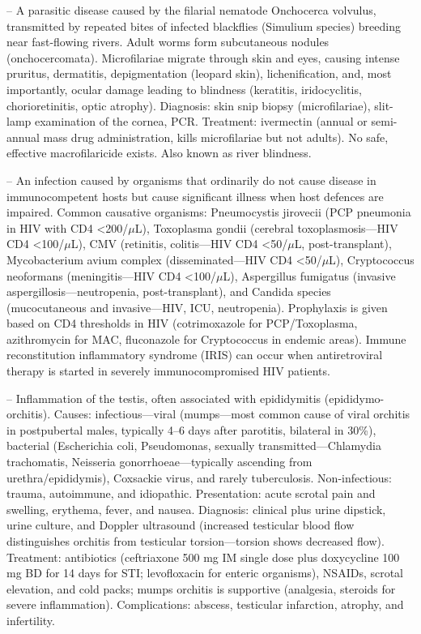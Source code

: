 -- A parasitic disease caused by the filarial nematode Onchocerca volvulus, transmitted by repeated bites of infected blackflies (Simulium species) breeding near fast-flowing rivers. Adult worms form subcutaneous nodules (onchocercomata). Microfilariae migrate through skin and eyes, causing intense pruritus, dermatitis, depigmentation (leopard skin), lichenification, and, most importantly, ocular damage leading to blindness (keratitis, iridocyclitis, chorioretinitis, optic atrophy). Diagnosis: skin snip biopsy (microfilariae), slit-lamp examination of the cornea, PCR. Treatment: ivermectin (annual or semi-annual mass drug administration, kills microfilariae but not adults). No safe, effective macrofilaricide exists. Also known as river blindness.

-- An infection caused by organisms that ordinarily do not cause disease in immunocompetent hosts but cause significant illness when host defences are impaired. Common causative organisms: Pneumocystis jirovecii (PCP pneumonia in HIV with CD4 <200/\(\mu\)L), Toxoplasma gondii (cerebral toxoplasmosis—HIV CD4 <100/\(\mu\)L), CMV (retinitis, colitis—HIV CD4 <50/\(\mu\)L, post-transplant), Mycobacterium avium complex (disseminated—HIV CD4 <50/\(\mu\)L), Cryptococcus neoformans (meningitis—HIV CD4 <100/\(\mu\)L), Aspergillus fumigatus (invasive aspergillosis—neutropenia, post-transplant), and Candida species (mucocutaneous and invasive—HIV, ICU, neutropenia). Prophylaxis is given based on CD4 thresholds in HIV (cotrimoxazole for PCP/Toxoplasma, azithromycin for MAC, fluconazole for Cryptococcus in endemic areas). Immune reconstitution inflammatory syndrome (IRIS) can occur when antiretroviral therapy is started in severely immunocompromised HIV patients.

-- Inflammation of the testis, often associated with epididymitis (epididymo-orchitis). Causes: infectious—viral (mumps—most common cause of viral orchitis in postpubertal males, typically 4--6 days after parotitis, bilateral in 30\%), bacterial (Escherichia coli, Pseudomonas, sexually transmitted—Chlamydia trachomatis, Neisseria gonorrhoeae—typically ascending from urethra/epididymis), Coxsackie virus, and rarely tuberculosis. Non-infectious: trauma, autoimmune, and idiopathic. Presentation: acute scrotal pain and swelling, erythema, fever, and nausea. Diagnosis: clinical plus urine dipstick, urine culture, and Doppler ultrasound (increased testicular blood flow distinguishes orchitis from testicular torsion—torsion shows decreased flow). Treatment: antibiotics (ceftriaxone 500 mg IM single dose plus doxycycline 100 mg BD for 14 days for STI; levofloxacin for enteric organisms), NSAIDs, scrotal elevation, and cold packs; mumps orchitis is supportive (analgesia, steroids for severe inflammation). Complications: abscess, testicular infarction, atrophy, and infertility.

